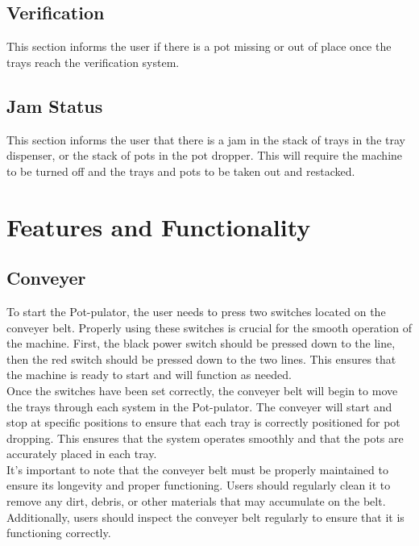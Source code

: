\documentclass[12pt, titlepage]{article}
\begin{document}
\subsection{Verification}
This section informs the user if there is a pot missing or out of place once the trays reach the verification system.
\subsection{Jam Status}
This section informs the user that there is a jam in the stack of trays in the tray dispenser, or the stack of pots in the pot dropper. This will require the machine to be turned off and the trays and pots to be taken out and restacked. 
\newpage
\section{Features and Functionality}
\subsection{Conveyer}
To start the Pot-pulator, the user needs to press two switches located on the conveyer belt. Properly using these switches is crucial for the smooth operation of the machine. First, the black power switch should be pressed down to the line, then the red switch should be pressed down to the two lines. This ensures that the machine is ready to start and will function as needed.
\\
\noindent Once the switches have been set correctly, the conveyer belt will begin to move the trays through each system in the Pot-pulator. The conveyer will start and stop at specific positions to ensure that each tray is correctly positioned for pot dropping. This ensures that the system operates smoothly and that the pots are accurately placed in each tray.
\\
\noindent It's important to note that the conveyer belt must be properly maintained to ensure its longevity and proper functioning. Users should regularly clean it to remove any dirt, debris, or other materials that may accumulate on the belt. Additionally, users should inspect the conveyer belt regularly to ensure that it is functioning correctly.
\end{document}
